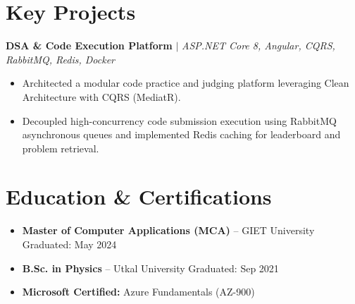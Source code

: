 \documentclass[a4paper,10pt]{article}
\begin{document}
\section{Key Projects}
\textbf{DSA \& Code Execution Platform} $|$ \textit{ASP.NET Core 8, Angular, CQRS, RabbitMQ, Redis, Docker}
\begin{itemize}[leftmargin=0.15in]
    \item Architected a modular code practice and judging platform leveraging Clean Architecture with CQRS (MediatR).
    \item Decoupled high-concurrency code submission execution using RabbitMQ asynchronous queues and implemented Redis caching for leaderboard and problem retrieval.
\end{itemize}

\section{Education \& Certifications}
\begin{itemize}[leftmargin=0.15in]
    \item \textbf{Master of Computer Applications (MCA)} -- GIET University \hfill Graduated: May 2024
    \item \textbf{B.Sc. in Physics} -- Utkal University \hfill Graduated: Sep 2021
    \item \textbf{Microsoft Certified:} Azure Fundamentals (AZ-900)
\end{itemize}
\end{document}
